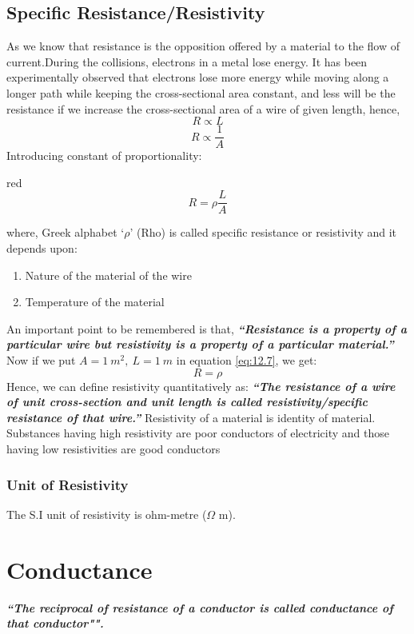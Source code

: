 \subsection{Specific Resistance/Resistivity}
 As we know that resistance is the opposition offered by a material to the flow of current.During the collisions, electrons in a metal lose energy. It has been experimentally observed that electrons lose more energy while moving along a longer path while keeping the cross-sectional area constant, and less will be the resistance if we increase the cross-sectional area of a wire of given length, hence,
 \begin{equation}\nonumber
     R\propto L
 \end{equation}
\begin{equation}\nonumber
     R\propto \frac{1}{A}    
\end{equation}
Introducing constant of proportionality:
\begin{mybox}{red}{}
\begin{equation}\label{eq:12.7}
     R=\rho\frac{L}{A}
\end{equation}
\end{mybox}
\noindent where, Greek alphabet ‘$\rho$’ (Rho) is called specific
resistance or resistivity and it depends upon:
\begin{enumerate}[label=(\roman*)] 
\item Nature of the material of the wire
\item Temperature of the material
\end{enumerate}
An important point to be remembered is that,
\textit{\textbf{``Resistance is a property of a particular wire but resistivity is a property of a particular material.”}}
Now if we put $A = 1\:m^{2},\:L=1\:m$ in equation \ref{eq:12.7}, we get:
\begin{equation}
    R = \rho \nonumber
\end{equation}
Hence, we can define resistivity quantitatively as:
\textit{\textbf{``The resistance of a wire of unit cross-section and unit length is called resistivity/specific resistance of  that wire.”}}
Resistivity of a material is identity of material. Substances having high resistivity are poor conductors of electricity and those having low resistivities are good conductors
\subsubsection{Unit of Resistivity}
The S.I unit of resistivity is ohm-metre ($\Omega$ m).
\section{Conductance}
\textit{\textbf{``The reciprocal of resistance of a conductor is called conductance of that conductor"".}}
